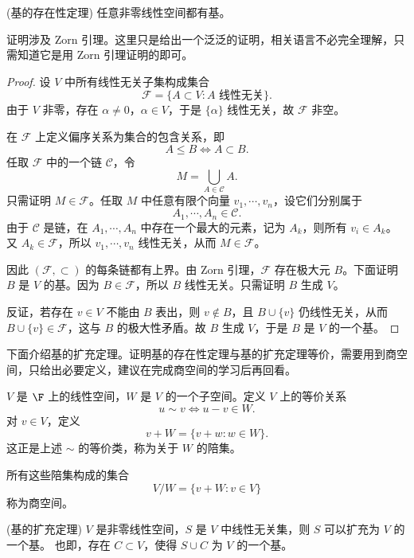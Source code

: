 \begin{proposition}(基的存在性定理)
	任意非零线性空间都有基。
\end{proposition}
证明涉及 Zorn 引理。这里只是给出一个泛泛的证明，相关语言不必完全理解，只需知道它是用 Zorn 引理证明的即可。
\begin{proof}
	设 $V$ 中所有线性无关子集构成集合
	\[
	\mathcal{F}=\{A\subset V: A\text{ 线性无关}\}.
	\]
	由于 $V$ 非零，存在 $\alpha\neq 0$，$\alpha\in V$，于是 $\{\alpha\}$ 线性无关，故 $\mathcal{F}$ 非空。
	
	在 $\mathcal{F}$ 上定义偏序关系为集合的包含关系，即
	\[
	A\leq B\Longleftrightarrow A\subset B.
	\]
	任取 $\mathcal{F}$ 中的一个链 $\mathcal{C}$，令
	\[
	M=\bigcup_{A\in\mathcal{C}}A.
	\]
	只需证明 $M\in\mathcal{F}$。任取 $M$ 中任意有限个向量 $v_1,\cdots,v_n$，设它们分别属于
	\[
	A_1,\cdots,A_n\in\mathcal{C}.
	\]
	由于 $\mathcal{C}$ 是链，在 $A_1,\cdots,A_n$ 中存在一个最大的元素，记为 $A_k$，则所有 $v_i\in A_k$。又 $A_k\in\mathcal{F}$，所以 $v_1,\cdots,v_n$ 线性无关，从而 $M\in\mathcal{F}$。
	
	因此 $(\mathcal{F},\subset)$ 的每条链都有上界。由 Zorn 引理，$\mathcal{F}$ 存在极大元 $B$。下面证明 $B$ 是 $V$ 的基。因为 $B\in\mathcal{F}$，所以 $B$ 线性无关。只需证明 $B$ 生成 $V$。
	
	反证，若存在 $v\in V$ 不能由 $B$ 表出，则 $v\notin B$，且 $B\cup\{v\}$ 仍线性无关，从而 $B\cup\{v\}\in\mathcal{F}$，这与 $B$ 的极大性矛盾。故 $B$ 生成 $V$，于是 $B$ 是 $V$ 的一个基。
\end{proof}

下面介绍基的扩充定理。证明基的存在性定理与基的扩充定理等价，需要用到商空间，只给出必要定义，建议在完成商空间的学习后再回看。

\begin{definition}\label{p1:concept:c4-l276}
	$V$ 是 $\F$ 上的线性空间，$W$ 是 $V$ 的一个子空间。定义 $V$ 上的等价关系
	\[
	u\sim v\Longleftrightarrow u-v\in W.
	\]
	对 $v\in V$，定义
	\[
	v+W=\{v+w:w\in W\}.
	\]
	这正是上述 $\sim$ 的等价类，称为关于 $W$ 的陪集。
	
	所有这些陪集构成的集合
	\[
	V/W=\{v+W:v\in V\}
	\]
	称为商空间。
\end{definition}

\begin{proposition}(基的扩充定理)
	$V$ 是非零线性空间，$S$ 是 $V$ 中线性无关集，则 $S$ 可以扩充为 $V$ 的一个基。
	也即，存在 $C\subset V$，使得 $S\cup C$ 为 $V$ 的一个基。
\end{proposition}


